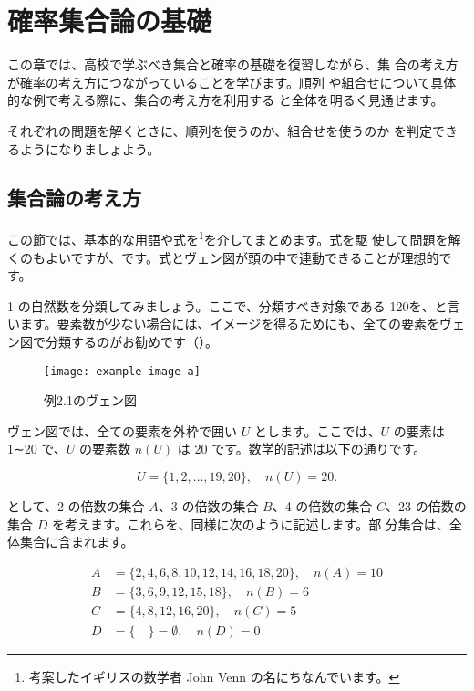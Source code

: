 \chapter{確率集合論の基礎}

\begin{chapintro}
    この章では、高校で学ぶべき集合と確率の基礎を復習しながら、集
    合の考え方が確率の考え方につながっていることを学びます。順列
    や組合せについて具体的な例で考える際に、集合の考え方を利用する
    と全体を明るく見通せます。
    
    それぞれの問題を解くときに、順列を使うのか、組合せを使うのか
    を判定できるようになりましょよう。
\end{chapintro}

\section{集合論の考え方}
この節では、基本的な用語や式を\footnote{考案したイギリスの数学者 John Venn の名にちなんでいます。}を介してまとめます。式を駆 使して問題を解くのもよいですが、です。式とヴェン図が頭の中で連動できることが理想的です。

\extitle{} 1 の自然数を分類してみましょう。ここで、分類すべき対象である 1\tildeto20を、と言います。要素数が少ない場合には、イメージを得るためにも、全ての要素をヴェン図で分類するのがお勧めです（{}）。

\begin{figure}[ht]
    \centering
    \texttt{[image: example-image-a]}
    \caption{例2.1のヴェン図\label{fig:ex2.1}}
\end{figure}

ヴェン図では、全ての要素を外枠で囲い $U$ とします。ここでは、$U$ の要素は 1∼20 で、$U$ の要素数 $n(U)$ は 20 です。数学的記述は以下の通りです。

\begin{equation*}
    U=\{1,2,\ldots,19,20\},\quad n(U)=20.
\end{equation*}

として、2 の倍数の集合 $A$、3 の倍数の集合 $B$、4 の倍数の集合 $C$、23 の倍数の集合 $D$ を考えます。これらを、同様に次のように記述します。部 分集合は、全体集合に含まれます。

\begin{align*}
    A &= \{2, 4, 6, 8, 10, 12, 14, 16, 18, 20\},\quad n(A) = 10\\
    B &= \{3, 6, 9, 12, 15, 18\},\quad n(B) = 6\\
    C &= \{4, 8, 12, 16, 20\},\quad n(C) = 5 \\
    D &= \{\quad\} = \emptyset,\quad n(D) = 0
\end{align*}


